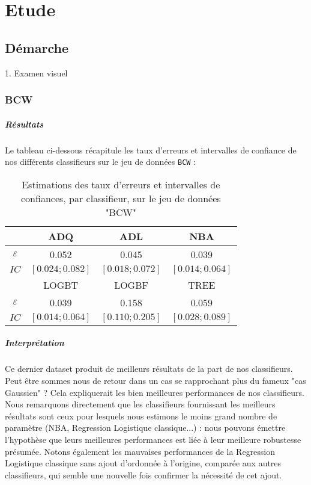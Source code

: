 \documentclass{report}
\begin{document}
\chapter{Etude}

\section{Démarche}
1. Examen visuel


\newpage
\subsection{BCW}
\paragraph{Résultats}
Le tableau ci-dessous récapitule les taux d'erreurs et intervalles de confiance de nos différents classifieurs sur le jeu de données \verb+BCW+ :

\begin{table}[h!]
    \centering
    \caption{Estimations des taux d'erreurs et intervalles de confiances, par classifieur, sur le jeu de données "BCW"}
    \label{tab:table1}
    \def\arraystretch{1.5}
    \begin{tabular}{c||c|c|c}
        \hline
        & ADQ & ADL & NBA\\
        \hline
        $\varepsilon$ & 0.052 & 0.045 & 0.039\\
        \hline
        $IC$ & $[0.024 ; 0.082]$ & $[0.018; 0.072]$ & $[0.014 ; 0.064]$\\
        \hline
        \hline
        & LOGBT & LOGBF & TREE\\
        \hline
        $\varepsilon$ & 0.039 & 0.158
        & 0.059\\
        \hline
        $IC$ & $[0.014 ; 0.064]$ & $[0.110 ; 0.205]$
        & $[0.028 ; 0.089]$\\
        \hline
        \hline
    \end{tabular}
\end{table}

\paragraph{Interprétation}
Ce dernier dataset produit de meilleurs résultats de la part de nos classifieurs. Peut être sommes nous de retour dans un cas se rapprochant plus du fameux "cas Gaussien" ? Cela expliquerait les bien meilleures performances de nos classifieurs. Nous remarquons directement que les classifieurs fournissant les meilleurs résultats sont ceux pour lesquels nous estimons le moins grand nombre de paramètre (NBA, Regression Logistique classique...) : nous pouvons émettre l'hypothèse que leurs meilleures performances est liée à leur meilleure robustesse présumée. Notons également les mauvaises performances de la Regression Logistique classique sans ajout d'ordonnée à l'origine, comparée aux autres classifieurs, qui semble une nouvelle fois confirmer la nécessité de cet ajout.
\end{document}
